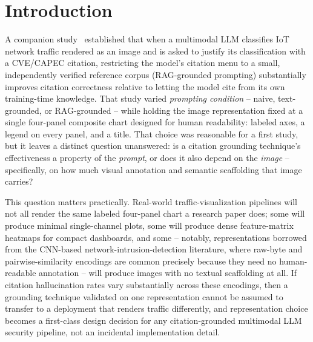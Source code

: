 \documentclass[11pt]{article}
\begin{document}
\begin{abstract}
three annotated representations (four\_panel, single\_line, heatmap) sustain 42--80\% classification
accuracy and 31--62\% correct-citation rates, while the three unannotated/dimensionality-varying
representations (recurrence\_plot, grayscale\_matrix, rgb\_stack) collapse to chance-level accuracy
($\approx$10\%, matching the 10-class base rate) for both models. Critically, this collapse is not a
retreat into honest uncertainty: both models continue to volunteer confident citations at low
unannotated-representation no-citation rates (0--16\%), and Qwen-vl-plus's collapse is total --
identical classification and citation output on literally every one of the 3,060 unannotated-image
calls, regardless of the true class. This is evidence for hallucination-through-fabrication (a
variant of H1) rather than hallucination-through-elaboration (H2): stripping annotation does not make
either model behave more conservatively, it makes both models guess with undiminished confidence.
\end{abstract}

\section{Introduction}

A companion study~\cite{groundingcitation2026} established that when a multimodal LLM classifies
IoT network traffic rendered as an image and is asked to justify its classification with a
CVE/CAPEC citation, restricting the model's citation menu to a small, independently verified
reference corpus (RAG-grounded prompting) substantially improves citation correctness relative to
letting the model cite from its own training-time knowledge. That study varied \emph{prompting
condition} -- naive, text-grounded, or RAG-grounded -- while holding the image representation fixed
at a single four-panel composite chart designed for human readability: labeled axes, a legend on
every panel, and a title. That choice was reasonable for a first study, but it leaves a distinct
question unanswered: is a citation grounding technique's effectiveness a property of the
\emph{prompt}, or does it also depend on the \emph{image} -- specifically, on how much visual
annotation and semantic scaffolding that image carries?

This question matters practically. Real-world traffic-visualization pipelines will not all render
the same labeled four-panel chart a research paper does; some will produce minimal single-channel
plots, some will produce dense feature-matrix heatmaps for compact dashboards, and some -- notably,
representations borrowed from the CNN-based network-intrusion-detection literature, where
raw-byte and pairwise-similarity encodings are common precisely because they need no human-readable
annotation -- will produce images with no textual scaffolding at all. If citation hallucination
rates vary substantially across these encodings, then a grounding technique validated on one
representation cannot be assumed to transfer to a deployment that renders traffic differently, and
representation choice becomes a first-class design decision for any citation-grounded multimodal
LLM security pipeline, not an incidental implementation detail.
\end{document}
